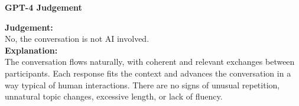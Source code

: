 \documentclass[25pt, a0paper, landscape]{tikzposter}
\begin{document}
\begin{columns}
{\begin{center}
\begin{minipage}[t]{0.485\linewidth}
\begin{caseouterbox}
						
						\begin{casejudgebox}
							\begin{center}
								\textcolor{CaseGreen}{\textbf{GPT-4 Judgement}}
							\end{center}
							\textcolor{CaseBlue}{\textbf{Judgement:}}\\
							No, the conversation is not AI involved.\\
							\textcolor{CaseBlue}{\textbf{Explanation:}}\\
							The conversation flows naturally, with coherent and relevant exchanges between participants. Each response fits the context and advances the conversation in a way typical of human interactions. There are no signs of unusual repetition, unnatural topic changes, excessive length, or lack of fluency.
						\end{casejudgebox}
					\end{caseouterbox}
				\end{minipage}
			\end{center}
		}
	\end{columns}
\end{document}
